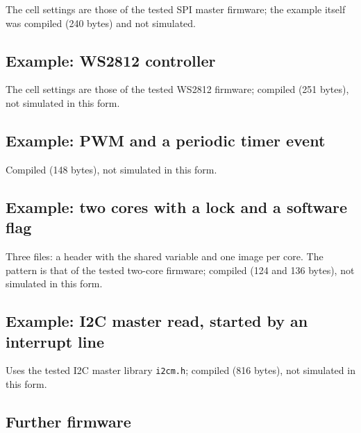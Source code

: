 \documentclass[10pt,a4paper]{article}
\begin{document}
The cell settings are those of the tested SPI master firmware; the example itself was compiled (240 bytes) and
not simulated.



\subsection{Example: WS2812 controller}

The cell settings are those of the tested WS2812 firmware; compiled (251 bytes), not simulated in this form.



\subsection{Example: PWM and a periodic timer event}\label{sec:expwm}

Compiled (148 bytes), not simulated in this form.



\subsection{Example: two cores with a lock and a software flag}\label{sec:ex2c}

Three files: a header with the shared variable and one image per core. The pattern is that of the tested
two-core firmware; compiled (124 and 136 bytes), not simulated in this form.





\subsection{Example: I2C master read, started by an interrupt line}

Uses the tested I2C master library \texttt{i2cm.h}; compiled (816 bytes), not simulated in this form.



\subsection{Further firmware}
\end{document}
